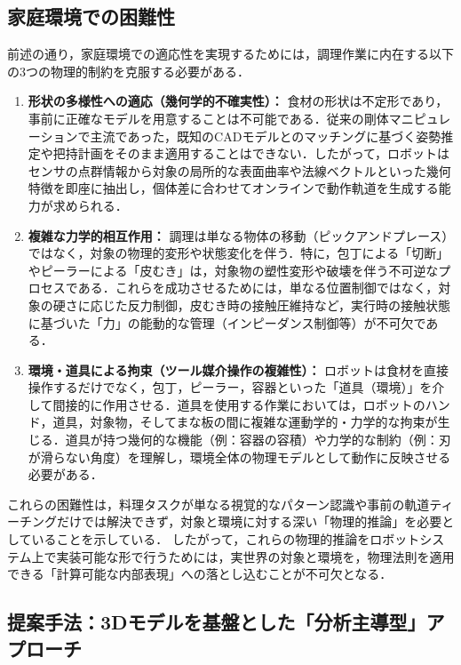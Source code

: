 \subsection{家庭環境での困難性}

前述の通り，家庭環境での適応性を実現するためには，調理作業に内在する以下の3つの物理的制約を克服する必要がある．

\begin{enumerate}
    \item \textbf{形状の多様性への適応（幾何学的不確実性）：} 食材の形状は不定形であり，事前に正確なモデルを用意することは不可能である．従来の剛体マニピュレーションで主流であった，既知のCADモデルとのマッチングに基づく姿勢推定や把持計画をそのまま適用することはできない．したがって，ロボットはセンサの点群情報から対象の局所的な表面曲率や法線ベクトルといった幾何特徴を即座に抽出し，個体差に合わせてオンラインで動作軌道を生成する能力が求められる．
    
    \item \textbf{複雑な力学的相互作用：} 調理は単なる物体の移動（ピックアンドプレース）ではなく，対象の物理的変形や状態変化を伴う．特に，包丁による「切断」やピーラーによる「皮むき」は，対象物の塑性変形や破壊を伴う不可逆なプロセスである．これらを成功させるためには，単なる位置制御ではなく，対象の硬さに応じた反力制御，皮むき時の接触圧維持など，実行時の接触状態に基づいた「力」の能動的な管理（インピーダンス制御等）が不可欠である．
    
    \item \textbf{環境・道具による拘束（ツール媒介操作の複雑性）：} ロボットは食材を直接操作するだけでなく，包丁，ピーラー，容器といった「道具（環境）」を介して間接的に作用させる．道具を使用する作業においては，ロボットのハンド，道具，対象物，そしてまな板の間に複雑な運動学的・力学的な拘束が生じる．道具が持つ幾何的な機能（例：容器の容積）や力学的な制約（例：刃が滑らない角度）を理解し，環境全体の物理モデルとして動作に反映させる必要がある．
\end{enumerate}

これらの困難性は，料理タスクが単なる視覚的なパターン認識や事前の軌道ティーチングだけでは解決できず，対象と環境に対する深い「物理的推論」を必要としていることを示している．
したがって，これらの物理的推論をロボットシステム上で実装可能な形で行うためには，実世界の対象と環境を，物理法則を適用できる「計算可能な内部表現」への落とし込むことが不可欠となる．

\subsection{提案手法：3Dモデルを基盤とした「分析主導型」アプローチ}

